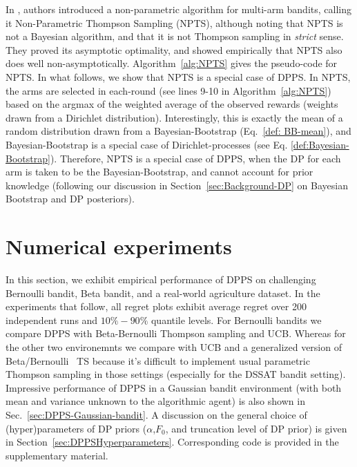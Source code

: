 \documentclass[10pt]{article}
\begin{document}
In \cite{riou2020bandit}, authors introduced a non-parametric algorithm for multi-arm bandits, calling it Non-Parametric Thompson Sampling (NPTS), although noting that NPTS is not a Bayesian algorithm, and that it is not Thompson sampling in \textit{strict} sense. They proved its asymptotic optimality, and showed empirically that NPTS also does well non-asymptotically. Algorithm~\ref{alg:NPTS} gives the pseudo-code for NPTS. In what follows, we show that NPTS is a special case of DPPS. In NPTS, the arms are selected in each-round (see lines 9-10 in Algorithm~\ref{alg:NPTS}) based on the argmax of the weighted average of the observed rewards (weights drawn from a Dirichlet distribution). Interestingly, this is exactly the mean of a random distribution drawn from a Bayesian-Bootstrap (Eq.~\ref{def: BB-mean}), and Bayesian-Bootstrap is a special case of Dirichlet-processes (see Eq. \ref{def:Bayesian-Bootstrap}). Therefore, NPTS is a special case of DPPS, when the DP for each arm is taken to be the Bayesian-Bootstrap, and cannot account for prior knowledge (following our discussion in Section~\ref{sec:Background-DP} on Bayesian Bootstrap and DP posteriors).


\section{Numerical experiments} \label{sec:Numerics}

In this section, we exhibit empirical performance of DPPS on challenging Bernoulli bandit, Beta bandit, and a real-world agriculture dataset. In the experiments that follow, all regret plots exhibit average regret over 200 independent runs and $10\%-90\%$ quantile levels. For Bernoulli bandits we compare DPPS with Beta-Bernoulli Thompson sampling and UCB. Whereas for the other two environemnts we compare with UCB and a generalized version of Beta/Bernoulli~\citep{agrawal2013thompson} TS because it's difficult to implement usual parametric Thompson sampling in those settings (especially for the DSSAT bandit setting). Impressive performance of DPPS in a Gaussian bandit environment (with both mean and variance unknown to the algorithmic agent) is also shown in Sec.~\ref{sec:DPPS-Gaussian-bandit}. A discussion on the general choice of (hyper)parameters of DP priors ($\alpha$,$F_{0}$, and truncation level of DP prior) is given in Section~\ref{sec:DPPSHyperparameters}. Corresponding code is provided in the supplementary material.
\end{document}
